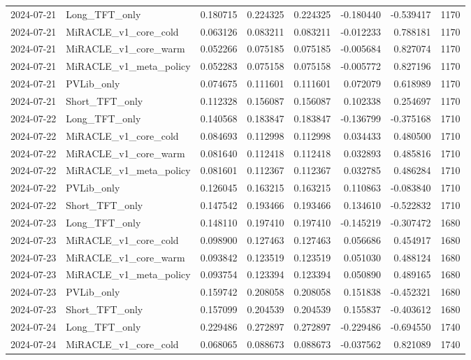 \begin{tabular}{llrrrrrr}
2024-07-21 & Long_TFT_only & 0.180715 & 0.224325 & 0.224325 & -0.180440 & -0.539417 & 1170 \\
2024-07-21 & MiRACLE_v1_core_cold & 0.063126 & 0.083211 & 0.083211 & -0.012233 & 0.788181 & 1170 \\
2024-07-21 & MiRACLE_v1_core_warm & 0.052266 & 0.075185 & 0.075185 & -0.005684 & 0.827074 & 1170 \\
2024-07-21 & MiRACLE_v1_meta_policy & 0.052283 & 0.075158 & 0.075158 & -0.005772 & 0.827196 & 1170 \\
2024-07-21 & PVLib_only & 0.074675 & 0.111601 & 0.111601 & 0.072079 & 0.618989 & 1170 \\
2024-07-21 & Short_TFT_only & 0.112328 & 0.156087 & 0.156087 & 0.102338 & 0.254697 & 1170 \\
2024-07-22 & Long_TFT_only & 0.140568 & 0.183847 & 0.183847 & -0.136799 & -0.375168 & 1710 \\
2024-07-22 & MiRACLE_v1_core_cold & 0.084693 & 0.112998 & 0.112998 & 0.034433 & 0.480500 & 1710 \\
2024-07-22 & MiRACLE_v1_core_warm & 0.081640 & 0.112418 & 0.112418 & 0.032893 & 0.485816 & 1710 \\
2024-07-22 & MiRACLE_v1_meta_policy & 0.081601 & 0.112367 & 0.112367 & 0.032785 & 0.486284 & 1710 \\
2024-07-22 & PVLib_only & 0.126045 & 0.163215 & 0.163215 & 0.110863 & -0.083840 & 1710 \\
2024-07-22 & Short_TFT_only & 0.147542 & 0.193466 & 0.193466 & 0.134610 & -0.522832 & 1710 \\
2024-07-23 & Long_TFT_only & 0.148110 & 0.197410 & 0.197410 & -0.145219 & -0.307472 & 1680 \\
2024-07-23 & MiRACLE_v1_core_cold & 0.098900 & 0.127463 & 0.127463 & 0.056686 & 0.454917 & 1680 \\
2024-07-23 & MiRACLE_v1_core_warm & 0.093842 & 0.123519 & 0.123519 & 0.051030 & 0.488124 & 1680 \\
2024-07-23 & MiRACLE_v1_meta_policy & 0.093754 & 0.123394 & 0.123394 & 0.050890 & 0.489165 & 1680 \\
2024-07-23 & PVLib_only & 0.159742 & 0.208058 & 0.208058 & 0.151838 & -0.452321 & 1680 \\
2024-07-23 & Short_TFT_only & 0.157099 & 0.204539 & 0.204539 & 0.155837 & -0.403612 & 1680 \\
2024-07-24 & Long_TFT_only & 0.229486 & 0.272897 & 0.272897 & -0.229486 & -0.694550 & 1740 \\
2024-07-24 & MiRACLE_v1_core_cold & 0.068065 & 0.088673 & 0.088673 & -0.037562 & 0.821089 & 1740 \\

\end{tabular}
